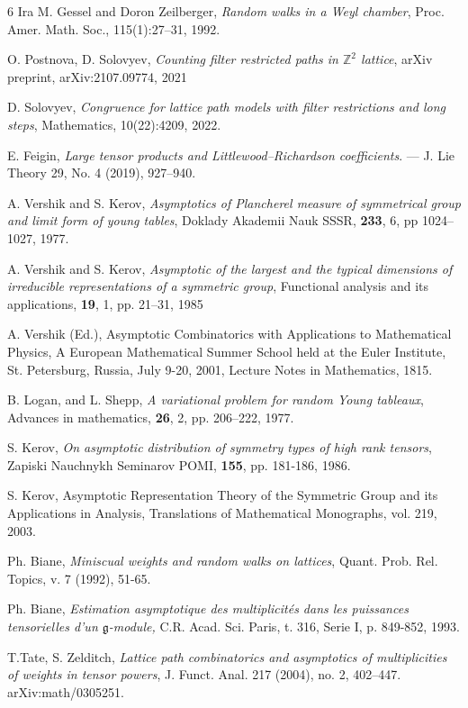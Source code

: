 \documentclass[11pt]{amsart}
\begin{document}
\begin{thebibliography}{6}
 Ira M. Gessel and Doron Zeilberger, {\it Random walks in a Weyl chamber}, Proc. Amer. Math. Soc.,
115(1):27–31, 1992.

 O. Postnova, D. Solovyev, {\it Counting filter restricted paths in $\mathbb{Z}^2$ lattice}, arXiv preprint, arXiv:2107.09774, 2021

 D. Solovyev, {\it Congruence for lattice path models with filter restrictions and long steps}, Mathematics, 10(22):4209, 2022.

 E. Feigin, {\it Large tensor products and Littlewood–Richardson coefficients}. — J. Lie Theory 29, No. 4 (2019), 927–940.

 A. Vershik and S. Kerov, {\it Asymptotics of Plancherel measure of symmetrical group and limit form of young tables},
Doklady Akademii Nauk SSSR, {\bf 233}, 6, pp 1024--1027, 1977.

 A. Vershik and S. Kerov, {\it Asymptotic of the largest and the typical dimensions of irreducible representations of a symmetric group}, Functional analysis and its applications, 
{\bf 19}, 1, pp. 21--31, 1985

 A. Vershik (Ed.), Asymptotic Combinatorics with Applications to Mathematical Physics, A European Mathematical Summer School held at the Euler Institute, St. Petersburg, Russia, July 9-20, 2001, Lecture Notes in Mathematics, 1815.

 B. Logan, and L. Shepp,  {\it A variational problem for random Young tableaux}, Advances in mathematics,
{\bf 26}, 2, pp. 206--222, 1977.

 S. Kerov, {\it On asymptotic distribution of symmetry types of high rank tensors}, Zapiski Nauchnykh Seminarov POMI, {\bf 155}, pp. 181-186, 1986.

 S. Kerov, Asymptotic Representation Theory of the Symmetric Group and its Applications in Analysis, Translations of Mathematical Monographs, vol. 219, 2003.

 Ph. Biane, {\it Miniscual weights and random walks on lattices}, Quant. Prob. Rel. Topics, v. 7 (1992), 51-65.

 Ph. Biane, {\it Estimation asymptotique des multiplicités  dans les puissances tensorielles d'un $\mathfrak{g}$-module,}
C.R. Acad. Sci. Paris, t. 316, Serie I, p. 849-852, 1993.

 T.Tate, S. Zelditch, {\it Lattice path combinatorics and asymptotics of multiplicities of weights in tensor powers},  J. Funct. Anal. 217 (2004), no. 2, 402--447.  arXiv:math/0305251.


\end{thebibliography}
\end{document}
